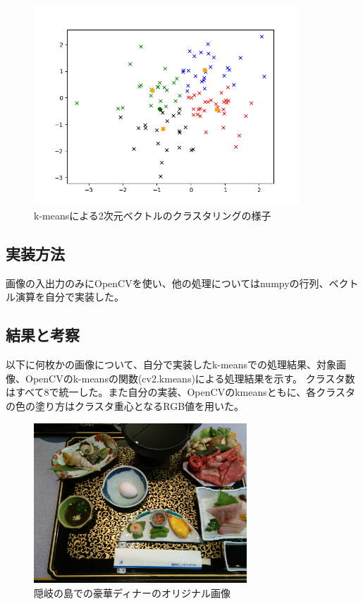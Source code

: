 \documentclass[11pt,a4j]{jsarticle}
\begin{document}
    \begin{figure}[H]
        \centering
        \includegraphics[clip,width=10.0cm]{img/kmeans_300.png}
        \caption{k-meansによる2次元ベクトルのクラスタリングの様子\label{fig:ex-kmeans}}
    \end{figure} 

    \subsection{実装方法}
    画像の入出力のみにOpenCVを使い、他の処理についてはnumpyの行列、ベクトル演算を自分で実装した。


    \subsection{結果と考察}
    以下に何枚かの画像について、自分で実装したk-meansでの処理結果、対象画像、OpenCVのk-meansの関数(cv2.kmeans)による処理結果を示す。
    クラスタ数はすべて8で統一した。また自分の実装、OpenCVのkmeansともに、各クラスタの色の塗り方はクラスタ重心となるRGB値を用いた。

    \begin{figure}[H]
        \centering
        \includegraphics[clip,width=80mm]{img/good_meal.jpg}
        \caption{隠岐の島での豪華ディナーのオリジナル画像\label{fig:good_meal}}
    \end{figure} 
\end{document}
